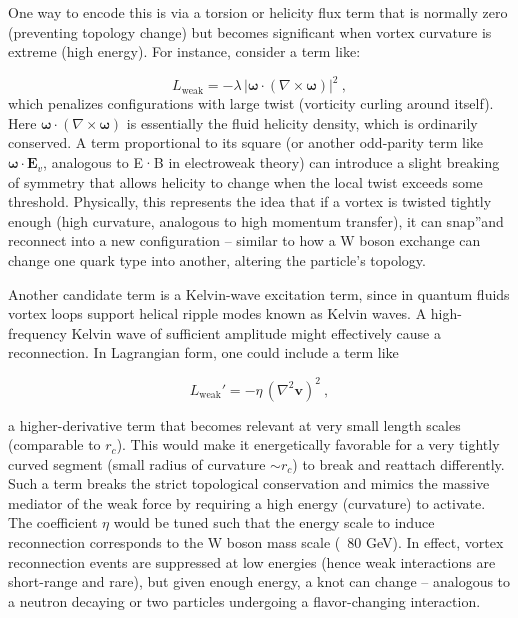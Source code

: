 One way to encode this is via a torsion or helicity flux term that is normally zero (preventing topology change) but becomes significant when vortex curvature is extreme (high energy). For instance, consider a term like:

\[
    L_{\text{weak}} = -\lambda \, |\mathbf{\omega} \cdot (\nabla \times \mathbf{\omega})|^2 ~,
\]
which penalizes configurations with large twist (vorticity curling around itself). Here $\mathbf{\omega} \cdot (\nabla \times \mathbf{\omega})$ is essentially the fluid helicity density, which is ordinarily conserved. A term proportional to its square (or another odd-parity term like $\mathbf{\omega}\cdot\mathbf{E}_v$, analogous to E·B in electroweak theory) can introduce a slight breaking of symmetry that allows helicity to change when the local twist exceeds some threshold. Physically, this represents the idea that if a vortex is twisted tightly enough (high curvature, analogous to high momentum transfer), it can \grqq snap\textquotedblright and reconnect into a new configuration – similar to how a W boson exchange can change one quark type into another, altering the particle's topology.


Another candidate term is a Kelvin-wave excitation term, since in quantum fluids vortex loops support helical ripple modes known as Kelvin waves. A high-frequency Kelvin wave of sufficient amplitude might effectively cause a reconnection. In Lagrangian form, one could include a term like

\[
    L_{\text{weak}}' = -\eta\,(\nabla^2 \mathbf{v})^2~,
\]

a higher-derivative term that becomes relevant at very small length scales (comparable to $r_c$). This would make it energetically favorable for a very tightly curved segment (small radius of curvature $\sim r_c$) to break and reattach differently. Such a term breaks the strict topological conservation and mimics the massive mediator of the weak force by requiring a high energy (curvature) to activate. The coefficient $\eta$ would be tuned such that the energy scale to induce reconnection corresponds to the W boson mass scale (~80 GeV). In effect, vortex reconnection events are suppressed at low energies (hence weak interactions are short-range and rare), but given enough energy, a knot can change – analogous to a neutron decaying or two particles undergoing a flavor-changing interaction.


